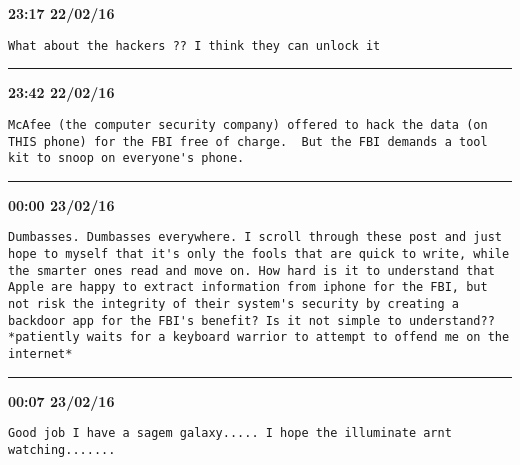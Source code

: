\begin{adjustwidth}{0cm}{0cm}
\footnotesize \textbf{23:17 22/02/16}

\begin{lstlisting}[breaklines, breakatwhitespace, basicstyle=\small, frame=leftline]
What about the hackers ?? I think they can unlock it
\end{lstlisting}
\end{adjustwidth}

\hrule%

\begin{adjustwidth}{0cm}{0cm}
\footnotesize \textbf{23:42 22/02/16}

\begin{lstlisting}[breaklines, breakatwhitespace, basicstyle=\small, frame=leftline]
McAfee (the computer security company) offered to hack the data (on THIS phone) for the FBI free of charge.  But the FBI demands a tool kit to snoop on everyone's phone.
\end{lstlisting}
\end{adjustwidth}

\hrule%

\begin{adjustwidth}{0cm}{0cm}
\footnotesize \textbf{00:00 23/02/16}

\begin{lstlisting}[breaklines, breakatwhitespace, basicstyle=\small, frame=leftline]
Dumbasses. Dumbasses everywhere. I scroll through these post and just hope to myself that it's only the fools that are quick to write, while the smarter ones read and move on. How hard is it to understand that Apple are happy to extract information from iphone for the FBI, but not risk the integrity of their system's security by creating a backdoor app for the FBI's benefit? Is it not simple to understand?? *patiently waits for a keyboard warrior to attempt to offend me on the internet*
\end{lstlisting}
\end{adjustwidth}

\hrule%

\begin{adjustwidth}{0cm}{0cm}
\footnotesize \textbf{00:07 23/02/16}

\begin{lstlisting}[breaklines, breakatwhitespace, basicstyle=\small, frame=leftline]
Good job I have a sagem galaxy..... I hope the illuminate arnt watching.......
\end{lstlisting}
\end{adjustwidth}

